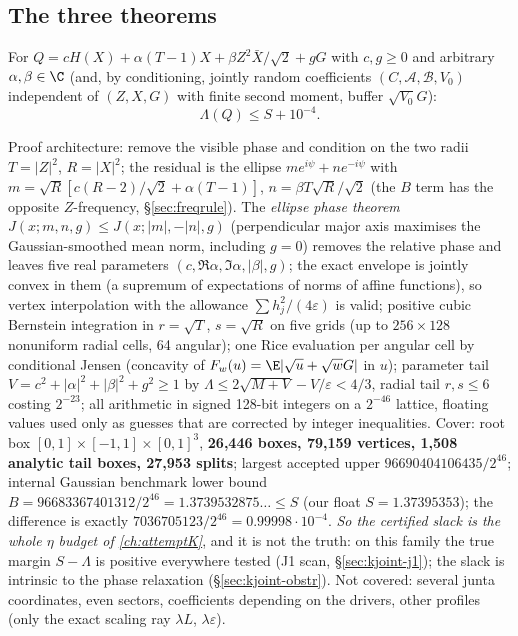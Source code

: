 \subsection{The three theorems}\label{sec:kjoint-thms}
\begin{theorem}\label{thm:kjoint-junta}
For $Q=cH(X)+\alpha(T-1)X+\beta Z^2\bar X/\sqrt2+gG$ with $c,g\ge0$ and arbitrary $\alpha,\beta\in\C$ (and, by conditioning, jointly random coefficients $(C,\mathcal A,\mathcal B,V_0)$
independent of $(Z,X,G)$ with finite second moment, buffer $\sqrt{V_0}G$):
\[
\Lambda(Q)\le S+10^{-4}.
\]
\end{theorem}
Proof architecture: remove the visible phase and condition on the two radii $T=|Z|^2$, $R=|X|^2$; the residual is the ellipse $me^{i\psi}+ne^{-i\psi}$ with
$m=\sqrt R[c(R-2)/\sqrt2+\alpha(T-1)]$, $n=\beta T\sqrt R/\sqrt2$ (the $B$ term has the opposite $Z$-frequency, \S\ref{sec:freqrule}). The \emph{ellipse phase theorem}
$J(x;m,n,g)\le J(x;|m|,-|n|,g)$ (perpendicular major axis maximises the Gaussian-smoothed mean norm, including $g=0$) removes the relative phase and leaves five real parameters
$(c,\Re\alpha,\Im\alpha,|\beta|,g)$; the exact envelope is jointly convex in them (a supremum of expectations of norms of affine functions), so vertex interpolation with the
allowance $\sum h_j^2/(4\varepsilon)$ is valid; positive cubic Bernstein integration in $r=\sqrt T$, $s=\sqrt R$ on five grids (up to $256\times128$ nonuniform radial cells, 64 angular);
one Rice evaluation per angular cell by conditional Jensen (concavity of $F_w(u)=\E|\sqrt u+\sqrt wG|$ in $u$); parameter tail $V=c^2+|\alpha|^2+|\beta|^2+g^2\ge1$ by
$\Lambda\le2\sqrt{M+V}-V/\varepsilon<4/3$, radial tail $r,s\le6$ costing $2^{-23}$; all arithmetic in signed 128-bit integers on a $2^{-46}$ lattice, floating values used only as
guesses that are corrected by integer inequalities. Cover: root box $[0,1]\times[-1,1]\times[0,1]^3$, \textbf{26,446 boxes, 79,159 vertices, 1,508 analytic tail boxes, 27,953 splits};
largest accepted upper $96690404106435/2^{46}$; internal Gaussian benchmark lower bound $B=96683367401312/2^{46}=1.3739532875\ldots\le S$ (our float $S=1.37395353$); the
difference is exactly $7036705123/2^{46}=0.99998\cdot10^{-4}$. \emph{So the certified slack is the whole $\eta$ budget of \autoref{ch:attemptK}}, and it is not the truth: on this family
the true margin $S-\Lambda$ is positive everywhere tested (J1 scan, \S\ref{sec:kjoint-j1}); the slack is intrinsic to the phase relaxation (\S\ref{sec:kjoint-obstr}).
Not covered: several junta coordinates, even sectors, coefficients depending on the drivers, other profiles (only the exact scaling ray $\lambda L$, $\lambda\varepsilon$).

